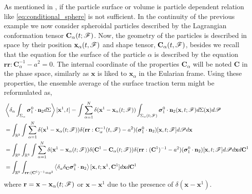As mentioned in \citet{hinch1977averaged}, if the particle surface or volume is particle dependent relation like \ref{eq:conditional_sphere} is not sufficient. 
In the continuity of the previous example we now consider spheroidal particles described by the Lagrangian conformation tensor $\textbf{C}_\alpha(t;\mathscr{F})$. 
Now, the geometry of the particles is described in space by their position $\textbf{x}_\alpha(t,\mathscr{F})$
and shape tensor, $\textbf{C}_\alpha(t,\mathscr{F})$, besides we recall that the equation for the surface of the particle $\alpha$ is described by the equation $\textbf{rr}:\textbf{C}^{-1}_\alpha - a^2 =0$. 
The internal coordinate of the properties $\textbf{C}_\alpha$ will be noted $\textbf{C}$ in the phase space, similarly as $\textbf{x}$ is liked to $\textbf{x}_\alpha$ in the Eularian frame.  
Using these properties, the ensemble average of the surface traction term might be reformulated as, 
\begin{align}
    &\left<\delta_\alpha \int_{\Sigma_\alpha} \bm\sigma_1^0\cdot\textbf{n}_2 d\Sigma\right>[\textbf{x}^1,t]
    = \int \sum_{\alpha=1}^N \delta(\textbf{x}^1-\textbf{x}_\alpha(t; \mathscr{F}))
    \int_{\Sigma_\alpha(t; \mathscr{F})}
    \bm\sigma_1^0\cdot\textbf{n}_2(\textbf{x},t;\mathscr{F})
    d\Sigma(\textbf{x}) d\mathscr{P}\nonumber\\
    &= 
    \int_{\mathbb{R}^3}
    \int
     \sum_{\alpha=1}^N \delta(\textbf{x}^1-\textbf{x}_\alpha(t; \mathscr{F}))
    \delta(\textbf{rr}: \textbf{C}_\alpha^{-1}(t,\mathscr{F}) -a^2)
    (\bm\sigma_1^0\cdot\textbf{n}_2)[\textbf{x},t;\mathscr{F}]
    d\mathscr{P}
    d\textbf{x}\nonumber\\
    &= 
    \int_{\mathbb{R}^9}
    \int_{\mathbb{R}^3}
    \int
     \sum_{\alpha=1}^N 
     \delta(\textbf{x}^1-\textbf{x}_\alpha(t; \mathscr{F}))
     \delta(\textbf{C}^1-\textbf{C}_\alpha(t; \mathscr{F}))
     \delta(\textbf{rr}: (\textbf{C}^1)^{-1} -a^2)
    (\bm\sigma_1^0\cdot\textbf{n}_2)[\textbf{x},t;\mathscr{F}]
    d\mathscr{P}
    d\textbf{x}
    d\textbf{C}^1
    \nonumber\\
    &=
    \int_{\mathbb{R}^9}
    \int_{\textbf{rr}: (\textbf{C}^1)^{-1} = a^2}
    \left<\delta_\alpha \delta_\textbf{C}  \bm\sigma_1^0\cdot \textbf{n}_2\right>
    [\textbf{x},t;\textbf{x}^1,\textbf{C}^1]
    d\textbf{x}d\textbf{C}^1
    \label{eq:conditional_spheroid}
\end{align}
where $\textbf{r} = \textbf{x} - \textbf{x}_{\alpha}(t;\mathscr{F})$ or $\textbf{x} - \textbf{x}^1$ due to the presence of $\delta(\textbf{x} - \textbf{x}^1)$. 
